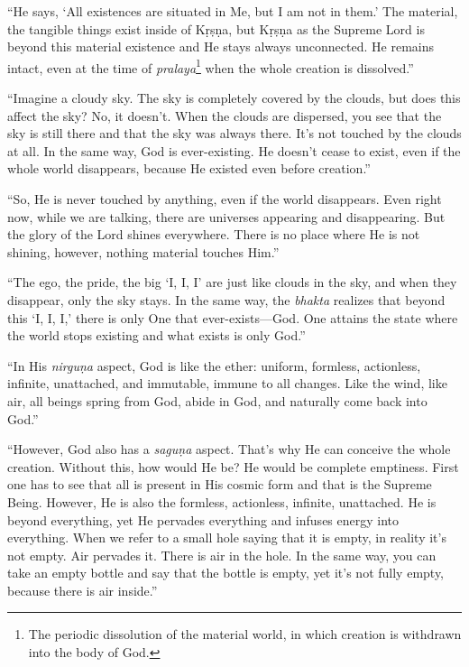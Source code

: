 \enquote{He says, \enquote{All existences are situated in Me, but I am not in them.} The material, the tangible things exist inside of Kṛṣṇa, but Kṛṣṇa as the Supreme Lord is beyond this material existence and He stays always unconnected. He remains intact, even at the time of \textit{pralaya}\footnote{The periodic dissolution of the material world, in which creation is withdrawn into the body of God.} when the whole creation is dissolved.}

\enquote{Imagine a cloudy sky. The sky is completely covered by the clouds, but does this affect the sky? No, it doesn’t. When the clouds are dispersed, you see that the sky is still there and that the sky was always there. It’s not touched by the clouds at all. In the same way, God is ever-existing. He doesn’t cease to exist, even if the whole world disappears, because He existed even before creation.}

\enquote{So, He is never touched by anything, even if the world disappears. Even right now, while we are talking, there are universes appearing and disappearing. But the glory of the Lord shines everywhere. There is no place where He is not shining, however, nothing material touches Him.}

\enquote{The ego, the pride, the big \enquote{I, I, I} are just like clouds in the sky, and when they disappear, only the sky stays. In the same way, the \textit{bhakta} realizes that beyond this \enquote{I, I, I,} there is only One that ever-exists---God. One attains the state where the world stops existing and what exists is only God.}

\enquote{In His \textit{nirguṇa} aspect, God is like the ether: uniform, formless, actionless, infinite, unattached, and immutable, immune to all changes. Like the wind, like air, all beings spring from God, abide in God, and naturally come back into God.}

\enquote{However, God also has a \textit{saguṇa} aspect. That’s why He can conceive the whole creation. Without this, how would He be? He would be complete emptiness. First one has to see that all is present in His cosmic form and that is the Supreme Being. However, He is also the formless, actionless, infinite, unattached. He is beyond everything, yet He pervades everything and infuses energy into everything. When we refer to a small hole saying that it is empty, in reality it’s not empty. Air pervades it. There is air in the hole. In the same way, you can take an empty bottle and say that the bottle is empty, yet it’s not fully empty, because there is air inside.}

